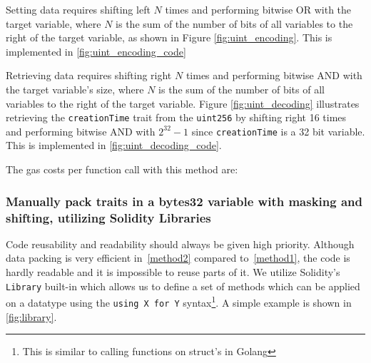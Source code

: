 Setting data requires shifting left $N$ times and performing bitwise OR with the target variable, where $N$ is the sum of the number of bits of all variables to the right of the target variable, as shown in Figure \ref{fig:uint_encoding}. This is implemented in \ref{fig:uint_encoding_code}




Retrieving data requires shifting right $N$ times and performing bitwise AND with the target variable's size, where $N$ is the sum of the number of bits of all variables to the right of the target variable. Figure \ref{fig:uint_decoding} illustrates retrieving the \texttt{creationTime} trait from the \texttt{uint256} by shifting right 16 times and performing bitwise AND with $2^{32}-1$ since \texttt{creationTime} is a 32 bit variable. This is implemented in \ref{fig:uint_decoding_code}.



The gas costs per function call with this method are: 


\subsubsection{Manually pack traits in a bytes32 variable with masking and shifting, utilizing Solidity Libraries} \label{method3}

Code reusability and readability should always be given high priority. Although data packing is very efficient in~\ref{method2} compared to~\ref{method1}, the code is hardly readable and it is impossible to reuse parts of it. %
We utilize Solidity's \texttt{Library} built-in which allows us to define a set of methods which can be applied on a datatype using the \texttt{using X for Y} syntax\footnote{This is similar to calling functions on struct's in Golang}. A simple example is shown in \ref{fig:library}.


